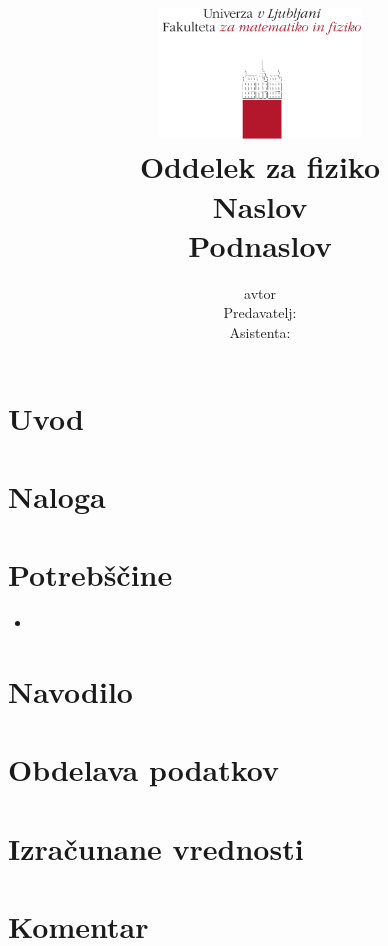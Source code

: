 \documentclass[12pt]{report}
\title{
  \includegraphics[width=0.4\textwidth]{fmf_logo}\\
  {\small Oddelek za fiziko} \\
  {Naslov}\\
  {\small Podnaslov}\\

}
\date{}
\author{ avtor \\[5 cm]
 \small  Predavatelj:\\
 \small  Asistenta:  \\
}
\begin{document}
\setcounter{page}{2}

\maketitle

\chapter*{Uvod}

\chapter*{Naloga}


\begingroup
\let\clearpage\relax

\chapter*{Potrebščine}
\begin{itemize}
\item 
\end{itemize}

\chapter*{Navodilo}

\endgroup


\chapter*{Obdelava podatkov}



\chapter*{Izračunane vrednosti}


\chapter*{Komentar}
\end{document}
